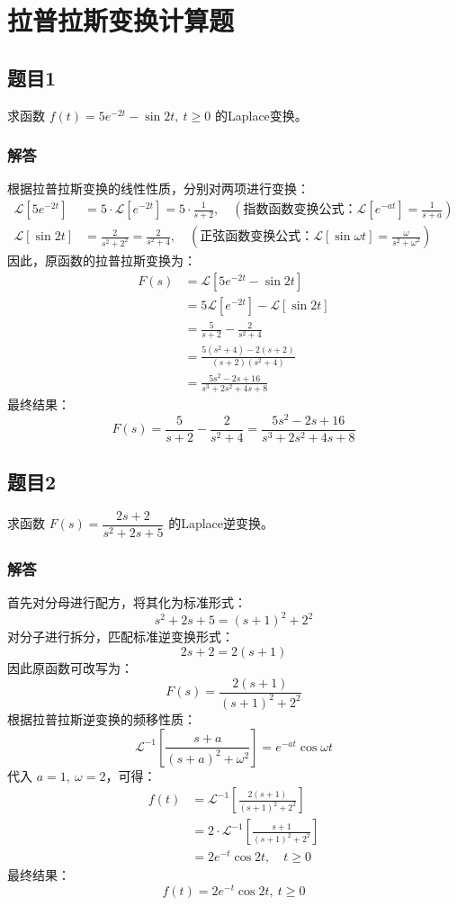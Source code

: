 \section{拉普拉斯变换计算题}

\subsection{题目1}
求函数 $f(t) = 5e^{-2t} - \sin 2t,\ t \geq 0$ 的Laplace变换。

\subsubsection{解答}
根据拉普拉斯变换的线性性质，分别对两项进行变换：
\begin{align*}
    \mathcal{L}\left[5e^{-2t}\right] &= 5 \cdot \mathcal{L}\left[e^{-2t}\right] = 5 \cdot \frac{1}{s+2}, \quad (\text{指数函数变换公式：}\mathcal{L}[e^{-at}] = \frac{1}{s+a}) \\
    \mathcal{L}\left[\sin 2t\right] &= \frac{2}{s^2 + 2^2} = \frac{2}{s^2 + 4}, \quad (\text{正弦函数变换公式：}\mathcal{L}[\sin \omega t] = \frac{\omega}{s^2+\omega^2})
\end{align*}
因此，原函数的拉普拉斯变换为：
\begin{align*}
    F(s) &= \mathcal{L}\left[5e^{-2t} - \sin 2t\right] \\
    &= 5\mathcal{L}\left[e^{-2t}\right] - \mathcal{L}\left[\sin 2t\right] \\
    &= \frac{5}{s+2} - \frac{2}{s^2+4} \\
    &= \frac{5(s^2+4) - 2(s+2)}{(s+2)(s^2+4)} \\
    &= \frac{5s^2 - 2s + 16}{s^3 + 2s^2 + 4s + 8}
\end{align*}
最终结果：
\[
\boxed{F(s) = \frac{5}{s+2} - \frac{2}{s^2+4} = \frac{5s^2 - 2s + 16}{s^3 + 2s^2 + 4s + 8}}
\]

\newpage
\subsection{题目2}
求函数 $F(s) = \dfrac{2s+2}{s^2+2s+5}$ 的Laplace逆变换。

\subsubsection{解答}
首先对分母进行配方，将其化为标准形式：
\[
s^2 + 2s + 5 = (s+1)^2 + 2^2
\]
对分子进行拆分，匹配标准逆变换形式：
\[
2s+2 = 2(s+1)
\]
因此原函数可改写为：
\[
F(s) = \frac{2(s+1)}{(s+1)^2 + 2^2}
\]
根据拉普拉斯逆变换的频移性质：
\[
\mathcal{L}^{-1}\left[\frac{s+a}{(s+a)^2 + \omega^2}\right] = e^{-at}\cos\omega t
\]
代入 $a=1,\ \omega=2$，可得：
\begin{align*}
    f(t) &= \mathcal{L}^{-1}\left[\frac{2(s+1)}{(s+1)^2 + 2^2}\right] \\
    &= 2 \cdot \mathcal{L}^{-1}\left[\frac{s+1}{(s+1)^2 + 2^2}\right] \\
    &= 2e^{-t}\cos 2t,\quad t \geq 0
\end{align*}
最终结果：
\[
\boxed{f(t) = 2e^{-t}\cos 2t,\ t \geq 0}
\]